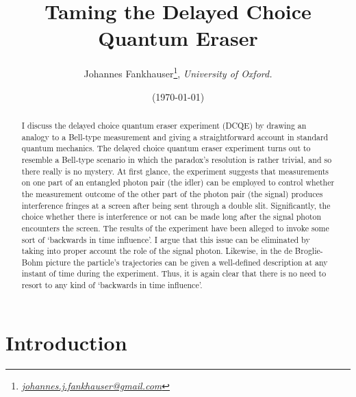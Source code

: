 \documentclass[11pt]{article}
\title{\textbf{Taming the Delayed Choice Quantum Eraser}}
\author[1]{Johannes Fankhauser\thanks{\href{mailto:johannes.j.fankhauser@gmail.com}{\it johannes.j.fankhauser@gmail.com}}, \it University of Oxford.}
\date{(\today)}                                             %
\numberwithin{equation}{section}
\begin{document}
\maketitle

\begin{abstract} 

I discuss the delayed choice quantum eraser experiment (DCQE) by drawing an analogy to a Bell-type measurement and giving a straightforward account in standard quantum mechanics. The delayed choice quantum eraser experiment turns out to resemble a Bell-type scenario in which the paradox's resolution is rather trivial, and so there really is no mystery.  At first glance, the experiment suggests that measurements on one part of an entangled photon pair (the idler) can be employed to control whether the measurement outcome of the other part of the photon pair (the signal) produces interference fringes at a screen after being sent through a double slit. Significantly, the choice whether there is interference or not can be made long after the signal photon encounters the screen. The results of the experiment have been alleged to invoke some sort of `backwards in time influence'. I argue that this issue can be eliminated by taking into proper account the role of the signal photon. Likewise, in the de Broglie-Bohm picture the particle's trajectories can be given a well-defined description at any instant of time during the experiment. Thus, it is again clear that there is no need to resort to any kind of `backwards in time influence'.  

 
\end{abstract}



\newpage

\section{Introduction}
\end{document}
